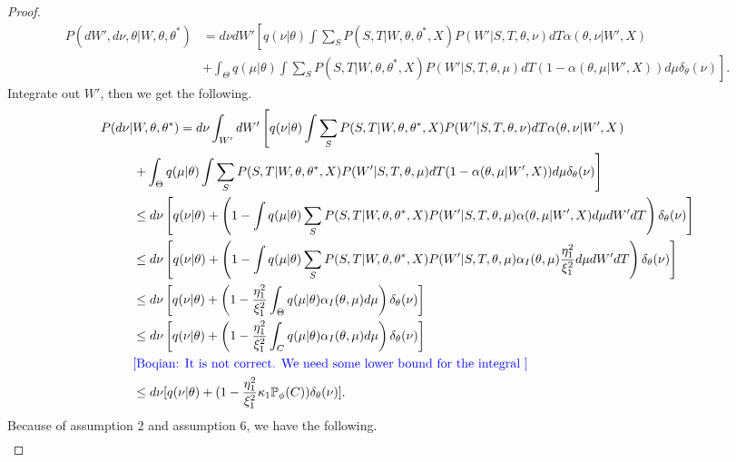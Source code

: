 \begin{proof}
\begin{align*}
P(dW', d\nu, \theta | W, \theta, \theta^*) &=d\nu dW' \left[q(\nu | \theta) \int \sum_S P(S, T | W, \theta, \theta^*, X)P(W' | S, T, \theta, \nu)dT\alpha(\theta, \nu | W', X)\right. \\
                                           &\left.+ \int_\Theta q(\mu | \theta) \int \sum_S P(S, T | W, \theta, \theta^*, X)P(W' | S, T, \theta, \mu)dT ( 1 - {\alpha(\theta, \mu | W', X)})d\mu \delta_\theta(\nu)\right].
\end{align*}
Integrate out $W'$, then we get the following.
\begin{align*}
  P(d\nu| &W, \theta, \theta^*) =d\nu \int_{W'}dW' \left[q(\nu | \theta) \int \sum_S P(S, T | W, \theta, \theta^*, X)P(W' | S, T, \theta, \nu)dT\alpha(\theta, \nu | W', X\right.)\\
&\left. + \int_\Theta q(\mu | \theta) \int \sum_S P(S, T | W, \theta, \theta^*, X)P(W' | S, T, \theta, \mu)dT ( 1 - \alpha(\theta, \mu | W', X))d\mu \delta_\theta(\nu)\right]\\
&\leq d\nu\left[q(\nu | \theta) +\left(1 -  \int q(\mu | \theta) \sum_S P(S, T|W, \theta, \theta^*, X)P(W'|S, T, \theta, \mu)\alpha(\theta, \mu | W', X)d\mu dW' dT\right) \delta_\theta(\nu)\right]\\
& \leq d\nu\left[q(\nu | \theta) +\left(1 -  \int q(\mu | \theta) \sum_S P(S, T|W, \theta, \theta^*, X)P(W'|S, T, \theta, \mu)\alpha_I(\theta, \mu) \frac{\eta_1^2}{\xi_1^2}d\mu dW' dT\right) \delta_\theta(\nu)\right]\\
          & \leq d\nu \left[q(\nu | \theta) + \left(1 - \frac{\eta_1^2}{\xi_1^2} \int_\Theta q(\mu | \theta)\alpha_I(\theta, \mu) d\mu\right)\delta_\theta(\nu)\right] \\
          & \leq d\nu \left[q(\nu | \theta) + \left(1 - \frac{\eta_1^2}{\xi_1^2} \int_C q(\mu | \theta)\alpha_I(\theta, \mu) d\mu\right)\delta_\theta(\nu)\right]\\
& \text{\textcolor{blue}{[Boqian: It is not correct. We need some lower bound for the integral ]}}\\
& \leq d\nu [q(\nu | \theta) + (1 - \frac{\eta_1^2}{\xi_1^2} \kappa_1 \mathbb{P}_\phi(C))\delta_\theta(\nu)].
\end{align*}
Because of assumption 2 and assumption 6, we have the following.
\begin{align*}

\end{align*}
\end{proof}
